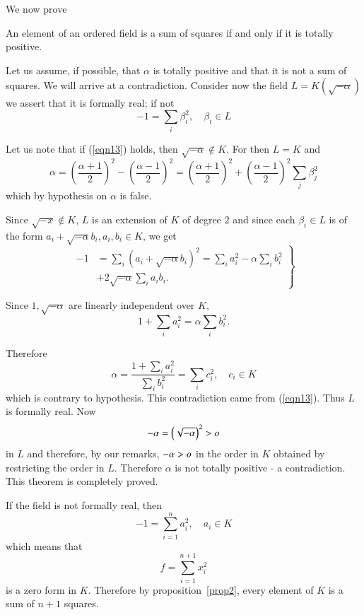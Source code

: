 We now prove


\begin{thm}\label{thm2}
An element of an ordered field is a sum of squares if and only if it
is totally positive.
\end{thm}

\begin{Proof}
Let us assume, if possible, that $\alpha$ is totally positive and that
it is not a sum of squares. We will arrive at a
contradiction. Consider now the field $L=K(\sqrt{-\alpha})$ we assert
that it is formally real; if not 
\begin{equation}\label{eqn13}
-1=\sum\limits_{i}\beta^{2}_i,\quad \beta_i\in L
\end{equation}

Let us note that if (\ref{eqn13}) holds, then $\sqrt{-\alpha} \notin
K$. For then $L=K$ and 
$$
\alpha=
\left(\dfrac{\alpha+1}{2}\right)^{2}-\left(\dfrac{\alpha-1}{2}\right)^{2}=
\left(\dfrac{\alpha+1}{2}\right)^{2} + \left(\dfrac{\alpha-1}{2}\right)^{2}\sum\limits_{j}\beta^{2}_j
$$
which by hypothesis on $\alpha$ is false.

Since $\sqrt{-x} \notin K$, $L$ is an extension of $K$ of degree $2$
and since each $\beta_i\in L$ is of the form $a_i+\sqrt{-\alpha} b_i,
a_i, b_i\in K$, we get
\begin{equation*}
\left.
\begin{aligned}
-1&=\sum\limits_{i} (a_i+\sqrt{-\alpha} b_i)^{2}= \sum\limits_i
a^{2}_i-\alpha\sum\limits_ib^{2}_i\\
&+2\sqrt{-\alpha} \sum\limits_i a_ib_i.
\end{aligned}
\right\}
\end{equation*}

Since $1, \sqrt{-\alpha}$ are linearly independent over $K$, 
$$
1+\sum\limits_i a^{2}_i=\alpha \sum\limits_ib^{2}_i.
$$

Therefore
$$
\alpha=\dfrac{1+\sum\limits_ia^{2}_i}{\sum\limits_i b^{2}_i}=
\sum\limits_i c^{2}_i,\quad c_i\in K
$$
which is contrary to hypothesis. This contradiction came from
(\ref{eqn13}). Thus $L$ is formally real. Now
$$
-\alpha=\left(\sqrt{-\alpha}\right)^{2}>o
$$
in $L$ and therefore, by our remarks, $-\alpha>o$ in the order in
$K$ obtained by restricting the order in $L$. Therefore $\alpha$ is
not totally positive - a contradiction. This theorem is completely
proved.
\enprf
\end{Proof}


If the field is not formally real, then
$$
-1=\sum\limits_{i=1}^{n}a^{2}_i,\quad a_i\in K
$$
which means that
$$
f=\sum\limits_{i=1}^{n+1}x^{2}_i
$$
is a zero form in $K$. Therefore by proposition~\ref{prop2}, every element of
$K$ is a sum of $n+1$ squares.

